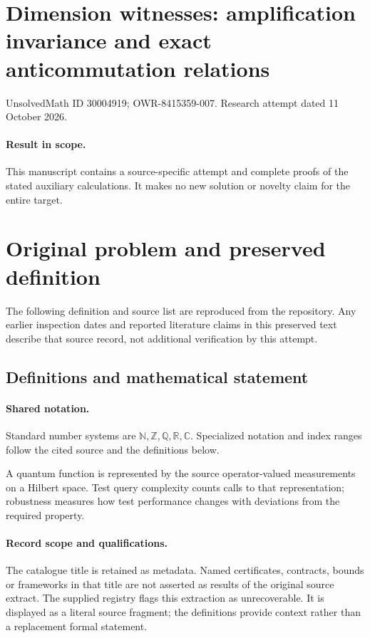 \documentclass[11pt]{article}
\begin{document}
\section*{Dimension witnesses: amplification invariance and exact anticommutation relations}
\noindent UnsolvedMath ID 30004919; OWR-8415359-007. Research attempt dated 11 October 2026.
\paragraph{Result in scope.}This manuscript contains a source-specific attempt and complete proofs of the stated auxiliary calculations. It makes no new solution or novelty claim for the entire target.
\section{Original problem and preserved definition}
The following definition and source list are reproduced from the repository. Any earlier inspection dates and reported literature claims in this preserved text describe that source record, not additional verification by this attempt.
\subsection{Definitions and mathematical statement}

\paragraph{Shared notation.}Standard number systems are $\mathbb N,\mathbb Z,\mathbb Q,\mathbb R,\mathbb C$. Specialized notation and index ranges follow the cited source and the definitions below.


A quantum function is represented by the source operator-valued measurements on a Hilbert space. Test query complexity counts calls to that representation; robustness measures how test performance changes with deviations from the required property.
\paragraph{Record scope and qualifications.}
The catalogue title is retained as metadata. Named certificates, contracts, bounds or frameworks in that title are not asserted as results of the original source extract.
The supplied registry flags this extraction as unrecoverable. It is displayed as a literal source fragment; the definitions provide context rather than a replacement formal statement.
\end{document}
